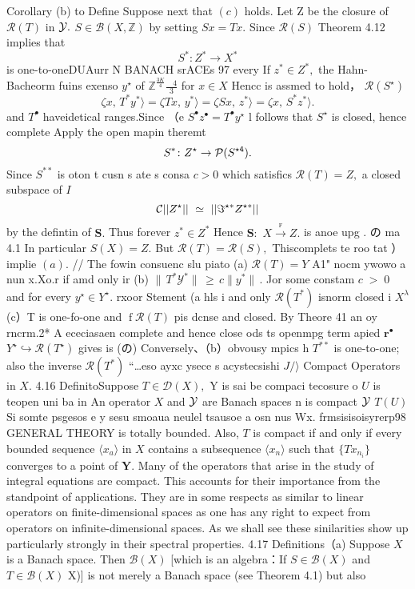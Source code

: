 Corollary (b) to Define Suppose next that $\left(c\right)$ holds. Let Z be the closure of ${\mathcal{R}}(T)$ in ${\cal{Y}}.$ $S\in{\mathcal{B}}(X,\mathbb{Z})$ by setting $S x=T x.$ Since ${\mathcal{R}}(S)$ Theorem 4.12 implies that $$ S^{*}\colon Z^{\ast}\to X^{*} $$ is one-to-oneDUAurr N BANACH srACEs 97 every If $z^{*}\in Z^{*},$ the Hahn-Bacheorm fuins exenso $y^{\star}$ of $\mathbb{Z}^{\frac{3K}{4}}{\frac{\,\,\,\,\,4}{3}}$ for $x\in X$ Hencc is assmed to hold， ${\mathcal{R}}(S^{\star})$ $$ \zeta x,\,T^{*}y^{*}\rangle=\zeta T x,\,y^{*}\rangle=\zeta S x,\,z^{*}\rangle=\zeta x,\,S^{*}z^{*}\rangle. $$ and $T^{\bullet}$ haveidetical ranges.Since （e $S^{\bullet}z^{\bullet}=T^{\bullet}y^{\star}$ l follows that $S^{\star}$ is closed, hence complete Apply the open mapin theremt $$ S^{*}\colon Z^{\star}\to{\mathcal{P}}(S^{\star\tt4}). $$ Since $S^{\ast\ast}$ is oton t cusn s ate s consa $c>0$ which satisfics ${\mathcal{R}}(T)=Z,$ a closed subspace of $\boldsymbol{\mathit{I}}$ $$ {\cal C}||Z^{\star}||\ \simeq\ ||\Im^{\star\ast}Z^{\star\ast}|| $$ by the defintin of ${\boldsymbol{S}}.$ Thus forever $z^{*}\in Z^{*}$ Hence $\mathbf{S}\!:$ $X{\overset{\underset{\mathrm{F}}{}}{\to}}Z.$ is anoe upg . の ma 4.1 In particular $\displaystyle S(X)=Z.$ But $\mathcal{R}(T)=\mathcal{R}(S),$ Thiscomplets te roo tat ） implie $(a).$ // The fowin consuenc slu piato (a) ${\mathcal{R}}(T)=Y$ A1" nocm ywowo a nun x.Xo.r if amd only ir (b) $\|\,T^{\ast}\mathcal{Y}^{\ast}\|\,\geq\,c\|y^{\ast}\|\,.$ Jor some constam $\scriptstyle c\;>\;0$ and for every $y^{\star}\in Y^{\star}.$ rxoor Stement (a hls i and only ${\mathcal{R}}(T^{*})$ isnorm closed i $X^{\lambda}$ (c）T is one-fo-one and $\operatorname{f}{\mathcal{R}}(T)$ pis dcnse and closed. By Theore 41 an oy rncrm.2* A ececiasaen complete and hence close ods ts openmpg term apied ${\boldsymbol{r}}^{\bullet}$ $Y^{\star}\hookrightarrow{\mathcal{R}}(T^{\star})$ gives is (の) Conversely、（b）obvousy mpics h $T^{**}$ is one-to-one; also the inverse ${\mathcal{R}}(T^{*})$ “…eso ayxc ysece s acystecsishi $J/\rangle$ Compact Operators in $X.$ 4.16 DefinitoSuppose $T\in{\mathcal{D}}(X),$ Y is sai be compaci tecosure o $U$ is teopen uni ba in An operator $\textstyle X$ and ${\cal{Y}}$ are Banach spaces n is compact ${\cal{Y}}$ $T(U)$ Si somte psgesos e y sesu smoaua neulel tsausoe a osn nus Wx. frmsisisoisyrerp98 GENERAL THEORY is totally bounded. Also, ${\mathbf{}}T$ is compact if and only if every bounded sequence $\scriptstyle \langle x_{a} \rangle$ in $\textstyle X$ contains a subsequence $\langle x_{n}\rangle$ such that $\{T x_{n_{i}}\}$ converges to a point of ${\boldsymbol{Y}}.$ Many of the operators that arise in the study of integral equations are compact. This accounts for their importance from the standpoint of applications. They are in some respects as similar to linear operators on finite-dimensional spaces as one has any right to expect from operators on infinite-dimensional spaces. As we shall see these sinilarities show up particularly strongly in their spectral properties. 4.17 Definitions（a) Suppose $\textstyle X$ is a Banach space. Then ${\mathcal{B}}(X)$ [which is an algebra：If $S\in{\mathcal{B}}(X)$ and $T\in{\mathcal{B}}(X)$ X)] is not merely a Banach space (see Theorem 4.1) but also 